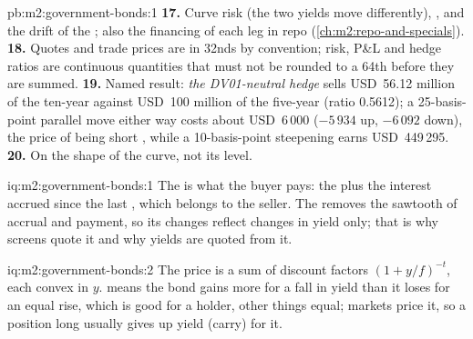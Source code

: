 \begin{solution}{pb:m2:government-bonds:1}
\textbf{17.} Curve risk (the two yields move differently), , and the
drift of the ; also the financing of each leg in repo (\cref{ch:m2:repo-and-specials}).
\textbf{18.} Quotes and trade prices are in 32nds by convention; risk,
P\&L and hedge ratios are continuous quantities that must not be rounded to
a 64th before they are summed.
\textbf{19.} Named result: \emph{the DV01-neutral hedge} sells USD~56.12 million
of the ten-year against USD~100 million of the five-year (ratio 0.5612); a
25-basis-point parallel move either way costs about USD~6\,000
($-5\,934$ up, $-6\,092$ down), the price of being short , while a
10-basis-point steepening earns USD~449\,295.
\textbf{20.} On the shape of the curve, not its level.
\end{solution}

\begin{solution}{iq:m2:government-bonds:1}
The  is what the buyer pays: the  plus the interest
accrued since the last , which belongs to the seller. The 
removes the sawtooth of accrual and  payment, so its changes reflect
changes in yield only; that is why screens quote it and why yields are quoted
from it.
\end{solution}

\begin{solution}{iq:m2:government-bonds:2}
The price is a sum of discount factors $(1 + y/f)^{-t}$, each convex in $y$.
 means the bond gains more for a fall in yield than it loses for an
equal rise, which is good for a holder, other things equal; markets price it,
so a position long  usually gives up yield (carry) for it.
\end{solution}

